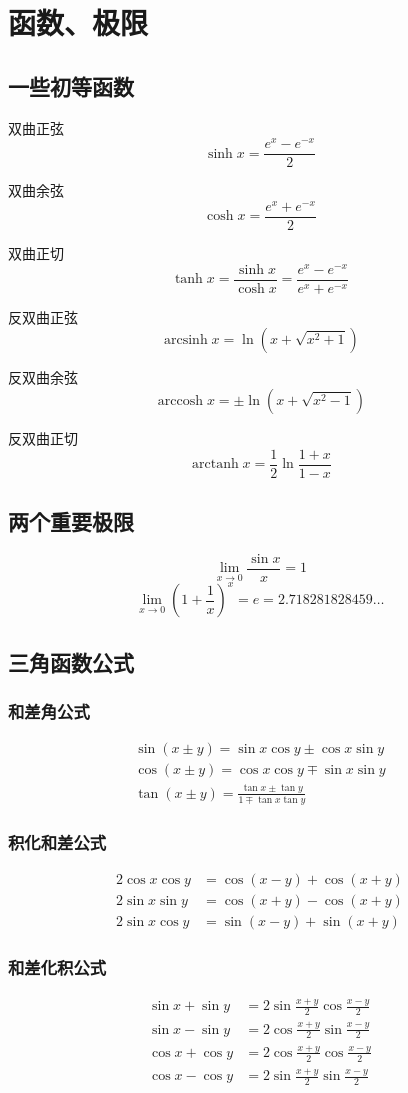 \section{函数、极限}
\subsection{一些初等函数}
双曲正弦\[\sinh x=\frac{e^x-e^{-x}}{2}\]

双曲余弦\[\cosh x=\frac{e^x+e^{-x}}{2}\]

双曲正切\[\tanh x=\frac{\sinh x}{\cosh x}=\frac{e^x-e^{-x}}{e^x+e^{-x}}\]

反双曲正弦\[\operatorname{arcsinh} x=\ln\left(x+\sqrt{x^2+1}\right)\]

反双曲余弦\[\operatorname{arccosh} x=\pm\ln\left(x+\sqrt{x^2-1}\right)\]

反双曲正切\[\operatorname{arctanh} x=\frac12\ln\frac{1+x}{1-x}\]
\subsection{两个重要极限}
\[\lim_{x\to 0}\frac{\sin x}{x}=1\]
\[\lim_{x\to 0}(1+\frac 1x)^x=e=2.718281828459\ldots\]
\subsection{三角函数公式}
\subsubsection{和差角公式}
\begin{gather*}
    \sin(x\pm y)=\sin x\cos y\pm\cos x\sin y\\
\cos(x\pm y)=\cos x\cos y\mp\sin x\sin y\\
\tan(x\pm y)=\frac{\tan x\pm\tan y}{1\mp\tan x\tan y}
\end{gather*}
\subsubsection{积化和差公式}
\begin{align*}
    2\cos x \cos y &=\cos \left( x -y \right) +\cos \left( x +y \right) \\
    2\sin x \sin y &=\cos \left( x +y \right) -\cos \left( x +y \right) \\
    2\sin x \cos y &=\sin \left( x -y \right) +\sin \left( x +y \right) 
\end{align*}
\subsubsection{和差化积公式}
\begin{align*}
\sin x+\sin y&=2\sin\frac{x+y}{2}\cos\frac{x-y}{2}\\
\sin x-\sin y&=2\cos\frac{x+y}{2}\sin\frac{x-y}{2}\\
\cos x+\cos y&=2\cos\frac{x+y}{2}\cos\frac{x-y}{2}\\
\cos x-\cos y&=2\sin\frac{x+y}{2}\sin\frac{x-y}{2}
\end{align*}

